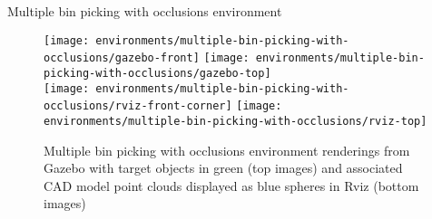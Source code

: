 \begin{frame}{Multiple bin picking with occlusions environment}
	\begin{figure}
		\centering
		\texttt{[image: environments/multiple-bin-picking-with-occlusions/gazebo-front]}
		\texttt{[image: environments/multiple-bin-picking-with-occlusions/gazebo-top]}\\
		\texttt{[image: environments/multiple-bin-picking-with-occlusions/rviz-front-corner]}
		\texttt{[image: environments/multiple-bin-picking-with-occlusions/rviz-top]}
		\caption{Multiple bin picking with occlusions environment renderings from Gazebo with target objects in green (top images) and associated CAD model point clouds displayed as blue spheres in Rviz (bottom images)}
	\end{figure}
\end{frame}
